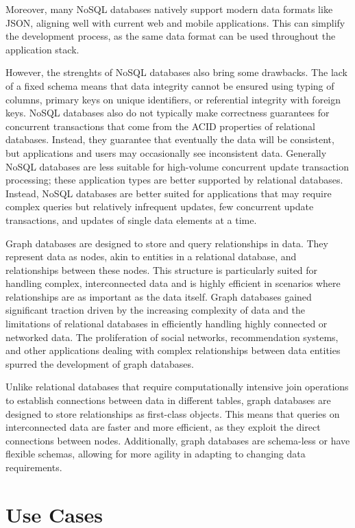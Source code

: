 Moreover, many NoSQL databases natively support modern data formats like JSON, aligning well with current web and mobile applications. This can simplify the development process, as the same data format can be used throughout the application stack.

However, the strenghts of NoSQL databases also bring some drawbacks. The lack of a fixed schema means that data integrity cannot be ensured using typing of columns, primary keys on unique identifiers, or referential integrity with foreign keys. NoSQL databases also do not typically make correctness guarantees for concurrent transactions that come from the ACID properties of relational databases. Instead, they guarantee that eventually the data will be consistent, but applications and users may occasionally see inconsistent data. Generally NoSQL databases are less suitable for high-volume concurrent update transaction processing; these application types are better supported by relational databases. Instead, NoSQL databases are better suited for applications that may require complex queries but relatively infrequent updates, few concurrent update transactions, and updates of single data elements at a time.

Graph databases are designed to store and query relationships in data. They represent data as nodes, akin to entities in a relational database, and relationships between these nodes. This structure is particularly suited for handling complex, interconnected data and is highly efficient in scenarios where relationships are as important as the data itself. Graph databases gained significant traction driven by the increasing complexity of data and the limitations of relational databases in efficiently handling highly connected or networked data. The proliferation of social networks, recommendation systems, and other applications dealing with complex relationships between data entities spurred the development of graph databases.

Unlike relational databases that require computationally intensive join operations to establish connections between data in different tables, graph databases are designed to store relationships as first-class objects. This means that queries on interconnected data are faster and more efficient, as they exploit the direct connections between nodes. Additionally, graph databases are schema-less or have flexible schemas, allowing for more agility in adapting to changing data requirements.

\section{Use Cases}

